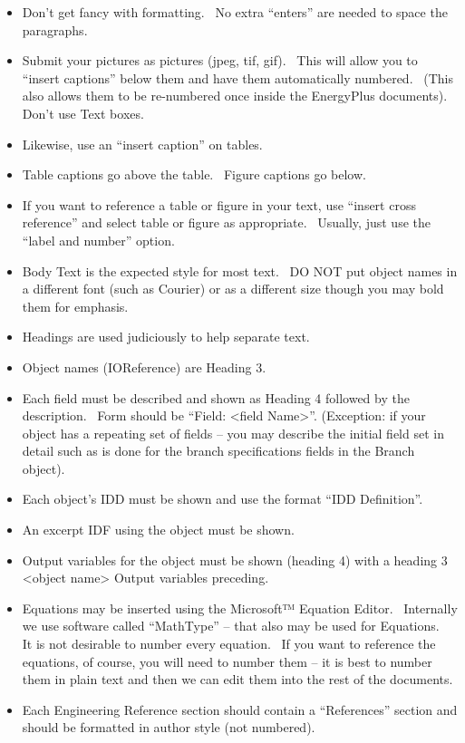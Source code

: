 \begin{itemize}
\item
  Don't get fancy with formatting.~ No extra ``enters'' are needed to space the paragraphs.
\item
  Submit your pictures as pictures (jpeg, tif, gif).~ This will allow you to ``insert captions'' below them and have them automatically numbered.~ (This also allows them to be re-numbered once inside the EnergyPlus documents).~ Don't use Text boxes.
\item
  Likewise, use an ``insert caption'' on tables.
\item
  Table captions go above the table.~ Figure captions go below.
\item
  If you want to reference a table or figure in your text, use ``insert cross reference'' and select table or figure as appropriate.~ Usually, just use the ``label and number'' option.
\item
  Body Text is the expected style for most text.~ DO NOT put object names in a different font (such as Courier) or as a different size though you may bold them for emphasis.
\item
  Headings are used judiciously to help separate text.
\item
  Object names (IOReference) are Heading 3.
\item
  Each field must be described and shown as Heading 4 followed by the description.~ Form should be ``Field: \textless{}field Name\textgreater{}''. (Exception: if your object has a repeating set of fields -- you may describe the initial field set in detail such as is done for the branch specifications fields in the Branch object).
\item
  Each object's IDD must be shown and use the format ``IDD Definition''.
\item
  An excerpt IDF using the object must be shown.
\item
  Output variables for the object must be shown (heading 4) with a heading 3 \textless{}object name\textgreater{} Output variables preceding.
\item
  Equations may be inserted using the Microsoft™ Equation Editor.~ Internally we use software called ``MathType'' -- that also may be used for Equations.~ It is not desirable to number every equation.~ If you want to reference the equations, of course, you will need to number them -- it is best to number them in plain text and then we can edit them into the rest of the documents.
\item
  Each Engineering Reference section should contain a ``References'' section and should be formatted in author style (not numbered).
\end{itemize}

